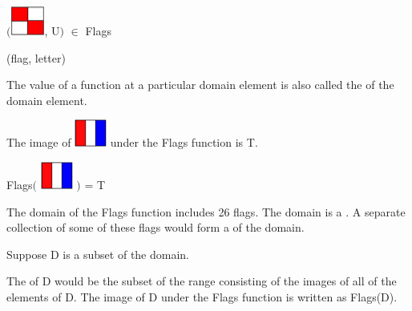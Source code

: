 \documentclass{ximera}
\begin{document}
\begin{exercise}
 $\bigg(${\includegraphics[width=42px,height=36px]{pics/flags/U.png}}, U$\bigg)$ $\in$ Flags 

  \begin{multipleChoice}
  \end{multipleChoice}
  \begin{feedback}
(flag, letter)
  \end{feedback}
\end{exercise}





\begin{definition}
The value of a function at a particular domain element is also called the  of the domain element.
  
\end{definition}

\begin{example}

The image of {\includegraphics[width=40px,height=34px]{pics/flags/T.png}} under the Flags function is T.

Flags$\bigg($ {\includegraphics[width=40px,height=34px]{pics/flags/T.png}} $\bigg)$ = T

\end{example}




\begin{definition}
  The domain of the Flags function includes 26 flags.  The domain is a .  A separate collection of some of these flags would form a  of the domain.
  
  Suppose D is a subset of the domain.
  
  The  of D would be the subset of the range consisting of the images of all of the elements of D. The image of D under the Flags function is written as Flags(D).
 
  
\end{definition}
\end{document}
